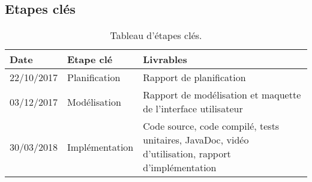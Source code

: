 \documentclass[]{article}
\begin{document}
\begin{samepage}
\subsection{Etapes clés }

\begin{table}[H]
\begin{center}
\begin{tabular}{|p{2cm}||p{7cm}|p{6cm}|}
\hline
Date & Etape clé & Livrables\\
\hline\hline
22/10/2017 & Planification & Rapport de planification  \\
\hline
03/12/2017 & Modélisation &  Rapport de modélisation et maquette
de l’interface utilisateur  \\
\hline
30/03/2018 & Implémentation & Code source, code compilé, tests unitaires, JavaDoc, vidéo d’utilisation, rapport
d’implémentation  \\
\hline
\end{tabular}
\end{center}
   \caption{Tableau d'étapes clés.}
   \label{tab:TEC}
\end{table}

\end{samepage}

\end{document}

